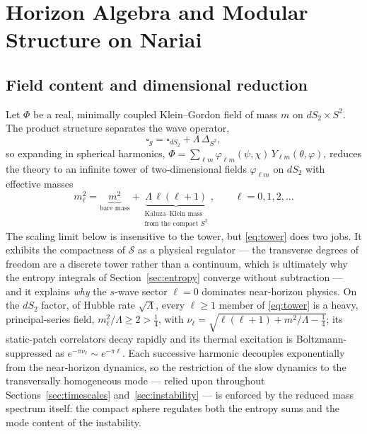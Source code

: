 \documentclass[11pt]{article}
\newcommand{\Nariai}{Nariai}
\begin{document}
\section{Horizon Algebra and Modular Structure on \Nariai{}}
\label{sec:algebra}

\subsection{Field content and dimensional reduction}

Let $\Phi$ be a real, minimally coupled Klein--Gordon field of mass $m$ on $dS_2 \times S^2$. The product structure separates the wave operator,
\begin{equation}
\square_g = \square_{dS_2} + \Lambda\, \Delta_{S^2},
\end{equation}
so expanding in spherical harmonics, $\Phi = \sum_{\ell m} \varphi_{\ell m}(\psi,\chi)\, Y_{\ell m}(\theta,\varphi)$, reduces the theory to an infinite tower of two-dimensional fields $\varphi_{\ell m}$ on $dS_2$ with effective masses
\begin{equation}
m_\ell^2 = \underbrace{m^2}_{\text{bare mass}} + \underbrace{\Lambda\,\ell(\ell+1)}_{\substack{\text{Kaluza--Klein mass}\\ \text{from the compact } S^2}}, \qquad \ell = 0, 1, 2, \dots
\label{eq:tower}
\end{equation}
The scaling limit below is insensitive to the tower, but \eqref{eq:tower} does two jobs. It exhibits the compactness of $\mathcal{S}$ as a physical regulator --- the transverse degrees of freedom are a discrete tower rather than a continuum, which is ultimately why the entropy integrals of Section~\ref{sec:entropy} converge without subtraction --- and it explains \emph{why} the $s$-wave sector $\ell = 0$ dominates near-horizon physics. On the $dS_2$ factor, of Hubble rate $\sqrt{\Lambda}$, every $\ell \ge 1$ member of \eqref{eq:tower} is a heavy, principal-series field, $m_\ell^2/\Lambda \ge 2 > \tfrac{1}{4}$, with $\nu_\ell = \sqrt{\ell(\ell+1) + m^2/\Lambda - \tfrac{1}{4}}$; its static-patch correlators decay rapidly and its thermal excitation is Boltzmann-suppressed as $e^{-\pi\nu_\ell} \sim e^{-\pi\ell}$. Each successive harmonic decouples exponentially from the near-horizon dynamics, so the restriction of the slow dynamics to the transversally homogeneous mode --- relied upon throughout Sections~\ref{sec:timescales} and~\ref{sec:instability} --- is enforced by the reduced mass spectrum itself: the compact sphere regulates both the entropy sums and the mode content of the instability.
\end{document}
